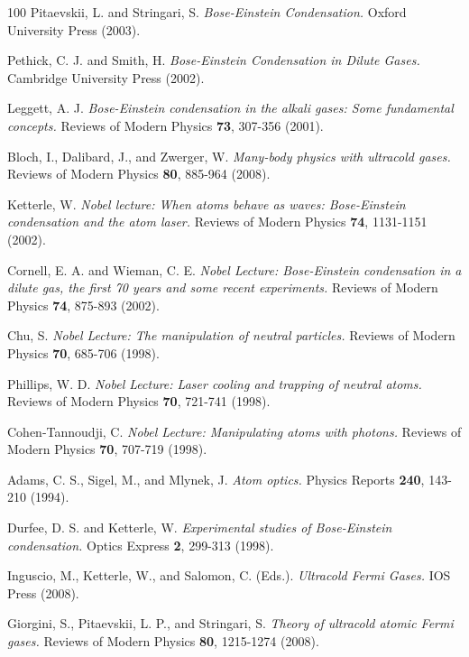 \documentclass[11pt]{article}
\theoremstyle{definition}
\begin{document}
\begin{thebibliography}{100}
Pitaevskii, L. and Stringari, S.
\textit{Bose-Einstein Condensation.}
Oxford University Press (2003).

Pethick, C. J. and Smith, H.
\textit{Bose-Einstein Condensation in Dilute Gases.}
Cambridge University Press (2002).

Leggett, A. J.
\textit{Bose-Einstein condensation in the alkali gases: Some fundamental concepts.}
Reviews of Modern Physics \textbf{73}, 307-356 (2001).

Bloch, I., Dalibard, J., and Zwerger, W.
\textit{Many-body physics with ultracold gases.}
Reviews of Modern Physics \textbf{80}, 885-964 (2008).

Ketterle, W.
\textit{Nobel lecture: When atoms behave as waves: Bose-Einstein condensation and the atom laser.}
Reviews of Modern Physics \textbf{74}, 1131-1151 (2002).

Cornell, E. A. and Wieman, C. E.
\textit{Nobel Lecture: Bose-Einstein condensation in a dilute gas, the first 70 years and some recent experiments.}
Reviews of Modern Physics \textbf{74}, 875-893 (2002).

Chu, S.
\textit{Nobel Lecture: The manipulation of neutral particles.}
Reviews of Modern Physics \textbf{70}, 685-706 (1998).

Phillips, W. D.
\textit{Nobel Lecture: Laser cooling and trapping of neutral atoms.}
Reviews of Modern Physics \textbf{70}, 721-741 (1998).

Cohen-Tannoudji, C.
\textit{Nobel Lecture: Manipulating atoms with photons.}
Reviews of Modern Physics \textbf{70}, 707-719 (1998).

Adams, C. S., Sigel, M., and Mlynek, J.
\textit{Atom optics.}
Physics Reports \textbf{240}, 143-210 (1994).

Durfee, D. S. and Ketterle, W.
\textit{Experimental studies of Bose-Einstein condensation.}
Optics Express \textbf{2}, 299-313 (1998).

Inguscio, M., Ketterle, W., and Salomon, C. (Eds.).
\textit{Ultracold Fermi Gases.}
IOS Press (2008).

Giorgini, S., Pitaevskii, L. P., and Stringari, S.
\textit{Theory of ultracold atomic Fermi gases.}
Reviews of Modern Physics \textbf{80}, 1215-1274 (2008).


\end{thebibliography}
\end{document}
